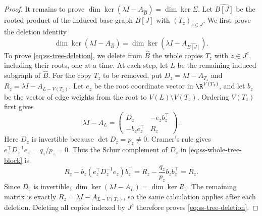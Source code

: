 \begin{proof}
It remains to prove $\dim\ker(\lambda I-A_{\widehat B})=\dim\ker \Sigma$.
Let $\widehat{B[J]}$ be the rooted product of the induced base graph
$B[J]$ with $(T_z)_{z\in J}$.
We first prove the deletion identity
\begin{equation}\label{eq:ss-tree-deletion}
 \dim\ker(\lambda I-A_{\widehat B})
 =\dim\ker(\lambda I-A_{\widehat{B[J]}}).
\end{equation}
To prove \cref{eq:ss-tree-deletion}, we delete from $\widehat B$
the whole copies $T_z$ with $z\in J^c$, including their roots, one at a time.
At each step, let $L$ be the remaining induced subgraph of $\widehat B$.
For the copy $T_z$ to be removed, put $D_z=\lambda I-A_{T_z}$ and
$R_z=\lambda I-A_{L-V(T_z)}$.
Let $e_z$ be the root coordinate vector in $\R^{V(T_z)}$, and let
$b_z$ be the vector of edge weights from the root to $V(L)\setminus V(T_z)$.
Ordering $V(T_z)$ first gives
\begin{equation}\label{eq:ss-whole-tree-block}
 \lambda I-A_L=
 \begin{pmatrix}D_z&-e_zb_z^{\top}\\-b_ze_z^{\top}&R_z\end{pmatrix}.
\end{equation}
Here $D_z$ is invertible because $\det D_z=p_z\ne0$.
Cramer's rule gives $e_z^{\top}D_z^{-1}e_z=q_z/p_z=0$.
Thus the Schur complement of $D_z$ in \cref{eq:ss-whole-tree-block} is
\begin{equation}\label{eq:ss-zero-tree-correction}
 R_z-b_z(e_z^{\top}D_z^{-1}e_z)b_z^{\top}
 =R_z-\frac{q_z}{p_z}b_zb_z^{\top}=R_z.
\end{equation}
Since $D_z$ is invertible,
$\dim\ker(\lambda I-A_L)=\dim\ker R_z$.
The remaining matrix is exactly $R_z=\lambda I-A_{L-V(T_z)}$,
so the same calculation applies after each deletion.
Deleting all copies indexed by $J^c$ therefore proves
\cref{eq:ss-tree-deletion}.


\end{proof}
